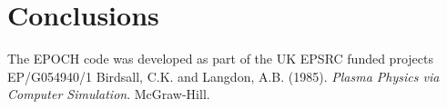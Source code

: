\documentclass[]{article}
\begin{document}
\section{Conclusions}
























{\def\section*#1{}
\begin{thebibliography}{1}
\setlength{\itemsep}{0pt}
The EPOCH code was developed as part of the UK EPSRC funded projects EP/G054940/1
Birdsall, C.K. and Langdon, A.B.  (1985). \textit{Plasma Physics via Computer Simulation}. McGraw-Hill.

\end{thebibliography}
}
\end{document}
